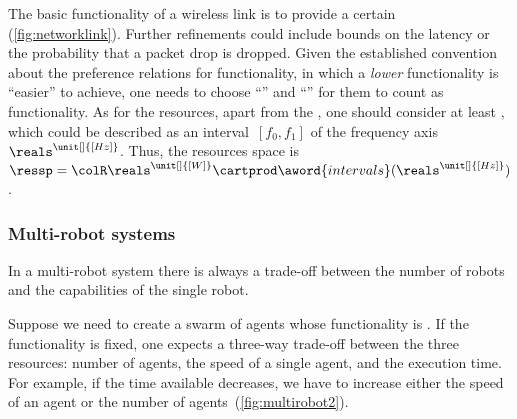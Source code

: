 \begin{example}
    The basic functionality of a wireless link is to provide a certain  (\cref{fig:networklink}).
    Further refinements could include bounds on the latency or the probability that a packet drop is dropped.
    Given the established convention about the preference relations for functionality, in which a \emph{lower} functionality is ``easier''
    to achieve, one needs to choose ``'' and ``'' for them to count as functionality.
    As for the resources, apart from the , one should consider at least , which could be described as an interval~$[f_0,f_1]$ of the frequency axis $\reals^{\unit[]{[Hz]}}$.
    Thus, the resources space is $\ressp=\colR\reals^{\unit[]{[W]}}\cartprod\aword{intervals}(\reals^{\unit[]{[Hz]}})$.
\end{example}
\begin{figure*}[h]
    \centering
    \caption{ }
    \label{fig:networklink}
\end{figure*}

\subsubsection{Multi-robot systems}

In a multi-robot system there is always a trade-off between the number of robots and the capabilities of the single robot.
\begin{example}
    Suppose we need to create a swarm of agents whose functionality is
    .
    If the functionality is fixed, one expects a three-way trade-off between the three resources: number of agents, the speed of a single agent, and the execution time.
    For example, if the time available decreases, we have to increase either the speed of an agent or the number of agents~(\cref{fig:multirobot2}).
\end{example}

\begin{figure}[h]
    \\
    \caption{}
\end{figure}

